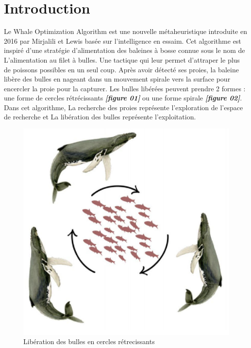 \documentclass[class=article, crop=false]{standalone}
\begin{document}
\section{Introduction}
Le Whale Optimization Algorithm est une nouvelle métaheuristique introduite en 2016 par Mirjalili et Lewis basée sur l’intelligence en essaim. Cet algorithme est inspiré d’une stratégie d’alimentation des baleines à bosse connue sous le nom de L'alimentation au filet à bulles. Une tactique qui leur permet d’attraper le plus de poissons possibles en un seul coup. Après avoir détecté ses proies, la baleine libère des bulles en nageant dans un mouvement spirale vers la surface pour encercler la proie pour la capturer.
Les bulles libérées peuvent prendre 2 formes : une forme de cercles rétrécissants \textbf{\emph{[figure 01]}} ou une forme spirale \textbf{\emph{[figure 02]}}. 
Dans cet algorithme, La recherche des proies représente l’exploration de l’espace de recherche et La libération des bulles représente l’exploitation.
\begin{figure}[H] 
    \includegraphics[width=\linewidth]{../figures/cercles.png}
    \caption{Libération des bulles en cercles rétrecissants}
\end{figure}
\end{document}
